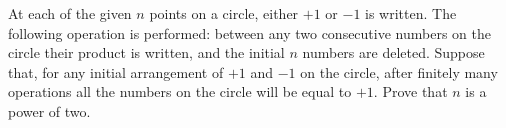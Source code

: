 At each of the given $n$ points on a circle, either $+1$ or $-1$ is written. The following operation is performed: between any two consecutive numbers on the circle their product is written, and the initial $n$ numbers are deleted. Suppose that, for any initial arrangement of $+1$ and $-1$ on the circle, after finitely many operations all the numbers on the circle will be equal to $+1$. Prove that $n$ is a power of two.